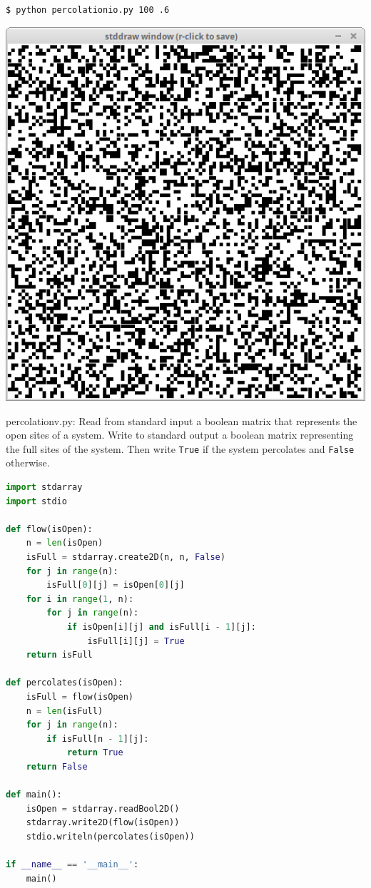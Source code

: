 \documentclass[8pt,a4paper,compress,handout]{beamer}
\begin{document}
\begin{frame}[fragile]
\begin{minipage}{160pt}
\begin{lstlisting}[language={}]
$ python percolationio.py 100 .6
\end{lstlisting}
\end{minipage}%
\begin{minipage}{140pt}
\hfill \includegraphics[scale=0.15]{figures/percolation3.png}
\end{minipage}
\end{frame}

\begin{frame}[fragile]
\begin{framed}
\tiny percolationv.py: Read from standard input a boolean matrix that represents the open sites of a system. Write to standard output a boolean matrix representing the full sites of the system. Then write \lstinline{True} if the system percolates and \lstinline{False} otherwise.
\end{framed}

\begin{lstlisting}[language=Python]
import stdarray
import stdio

def flow(isOpen):
    n = len(isOpen)
    isFull = stdarray.create2D(n, n, False)
    for j in range(n):
        isFull[0][j] = isOpen[0][j]
    for i in range(1, n):
        for j in range(n):
            if isOpen[i][j] and isFull[i - 1][j]:
                isFull[i][j] = True
    return isFull

def percolates(isOpen):
    isFull = flow(isOpen)
    n = len(isFull)
    for j in range(n):
        if isFull[n - 1][j]:
            return True
    return False

def main():
    isOpen = stdarray.readBool2D()
    stdarray.write2D(flow(isOpen))
    stdio.writeln(percolates(isOpen))
    
if __name__ == '__main__':
    main()
\end{lstlisting}
\end{frame}
\end{document}
